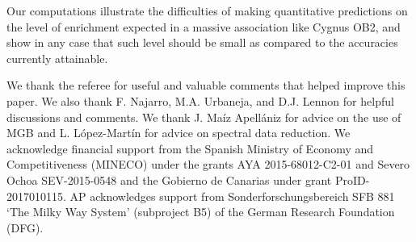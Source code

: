 \documentclass{aa} %
\begin{document}
Our computations illustrate the difficulties of making quantitative predictions on the level of enrichment expected in a massive association like Cygnus OB2, and show in any case that such level should be small as compared to the accuracies currently attainable.



 
\begin{acknowledgements}

We thank the referee for useful and valuable comments that helped improve this paper. We also thank F. Najarro, M.A. Urbaneja, and D.J. Lennon for helpful discussions and comments. We thank J. Ma\'iz Apell\'aniz for advice on the use of MGB and L. López-Martín for advice on spectral data reduction. We acknowledge financial support from the Spanish Ministry of Economy and Competitiveness (MINECO) under the grants AYA 2015-68012-C2-01 and Severo Ochoa SEV-2015-0548 and the Gobierno de Canarias under grant ProID-2017010115. AP acknowledges support from  Sonderforschungsbereich  SFB  881 ‘The Milky Way System’ (subproject B5) of the German Research Foundation (DFG).


\end{acknowledgements}





%
%


\def\bibname{References}
\end{document}
